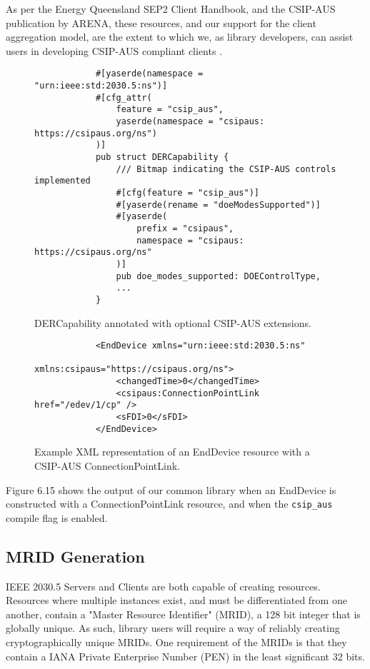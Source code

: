 As per the Energy Queensland SEP2 Client Handbook, and the CSIP-AUS publication by ARENA, these resources, and our support for the client aggregation model, are the extent to which we, as library developers, can assist users in developing CSIP-AUS compliant clients \cite{sep2clienthandbook} \cite{CSIPAus}. 

\begin{figure}[H]
    \begin{center}
        \begin{lstlisting}
            #[yaserde(namespace = "urn:ieee:std:2030.5:ns")]
            #[cfg_attr(
                feature = "csip_aus",
                yaserde(namespace = "csipaus: https://csipaus.org/ns")
            )]
            pub struct DERCapability {
                /// Bitmap indicating the CSIP-AUS controls implemented
                #[cfg(feature = "csip_aus")]
                #[yaserde(rename = "doeModesSupported")]
                #[yaserde(
                    prefix = "csipaus", 
                    namespace = "csipaus: https://csipaus.org/ns"
                )]
                pub doe_modes_supported: DOEControlType,
                ...
            }
        \end{lstlisting}
        \label{fig:csipausimpl}
        \caption{DERCapability annotated with optional CSIP-AUS extensions.}
    \end{center}
\end{figure}

\begin{figure}[H]
    \begin{center}
        \begin{lstlisting}
            <EndDevice xmlns="urn:ieee:std:2030.5:ns" 
                       xmlns:csipaus="https://csipaus.org/ns">
                <changedTime>0</changedTime>
                <csipaus:ConnectionPointLink  href="/edev/1/cp" />
                <sFDI>0</sFDI>
            </EndDevice>
        \end{lstlisting}
        \label{fig:enddeviceconnpointxml}
        \caption{Example XML representation of an EndDevice resource with a CSIP-AUS ConnectionPointLink.}
    \end{center}
\end{figure}

Figure 6.15 shows the output of our common library when an EndDevice is constructed with a ConnectionPointLink resource, and when the \texttt{csip\_aus} compile flag is enabled.


\subsection{MRID Generation}
IEEE 2030.5 Servers and Clients are both capable of creating resources. Resources where multiple instances exist, and must be differentiated from one another, contain a "Master Resource Identifier" (MRID), a 128 bit integer that is globally unique.
As such, library users will require a way of reliably creating cryptographically unique MRIDs. One requirement of the MRIDs is that they contain a IANA Private Enterprise Number (PEN) in the least significant 32 bits.

